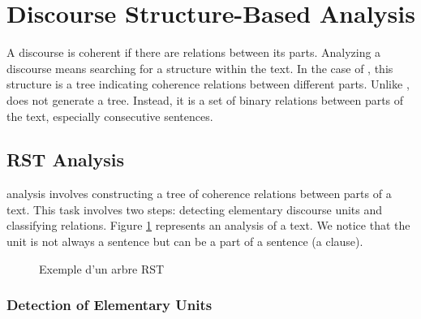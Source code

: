 \documentclass{KBook}
\begin{document}



\section{Discourse Structure-Based Analysis}

A discourse is coherent if there are relations between its parts. Analyzing a discourse means searching for a structure within the text. In the case of , this structure is a tree indicating coherence relations between different parts. Unlike ,  does not generate a tree. Instead, it is a set of binary relations between parts of the text, especially consecutive sentences.

\subsection{RST Analysis}

 analysis involves constructing a tree of coherence relations between parts of a text. This task involves two steps: detecting elementary discourse units and classifying relations. Figure \ref{fig:rst-exp} represents an  analysis of a text. We notice that the unit is not always a sentence but can be a part of a sentence (a clause).

\begin{figure}[!ht]
	\centering
	\caption{Exemple d'un arbre RST}
	\label{fig:rst-exp}
\end{figure}


\subsubsection{Detection of Elementary Units}
\end{document}
